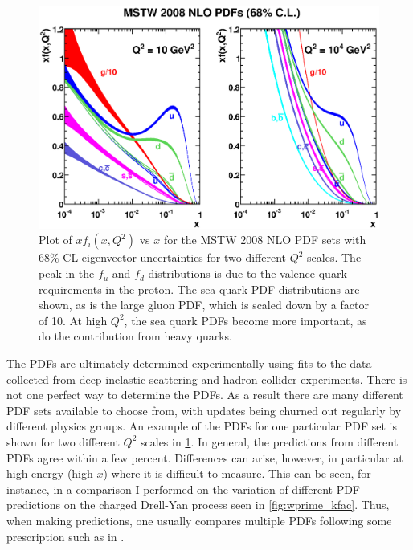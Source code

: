 \begin{figure}[ht]
\centering
\includegraphics[width=.9\textwidth]{figures/theory/mstw.eps}
\caption{Plot of $xf_i(x,Q^2)$ vs $x$ for the MSTW 2008 NLO PDF sets \cite{Martin:2009iq} with 68\% CL 
eigenvector uncertainties for two different $Q^2$ scales.
The peak in the $f_u$ and $f_d$ distributions is due to the valence
quark requirements in the proton. The sea quark PDF distributions are shown,
as is the large gluon PDF, which is scaled down by a factor of 10.  At
high $Q^2$, the sea quark PDFs become more important, as do the 
contribution from heavy quarks.}
\label{fig:pdf_mstw}
\end{figure}


The PDFs are ultimately determined experimentally using fits to the 
data collected from deep inelastic scattering and hadron
collider experiments. There is not one perfect way 
to determine the PDFs.  As a result there are many different
PDF sets available to choose from, with updates being churned
out regularly by different physics groups. An example of the
PDFs for one particular PDF set is shown for two different
$Q^2$ scales in \fig\ref{fig:pdf_mstw}.
In general, the predictions from different PDFs agree within a few percent.
Differences can arise, however, in particular at high energy (high $x$)
where it is difficult to measure.
This can be seen, for instance, in a comparison I performed
on the variation of different PDF predictions on the charged Drell-Yan process
seen in \fig\ref{fig:wprime_kfac}.
Thus, when making predictions, one usually compares multiple
PDFs following some prescription such as in \cite{Botje:2011sn}.





